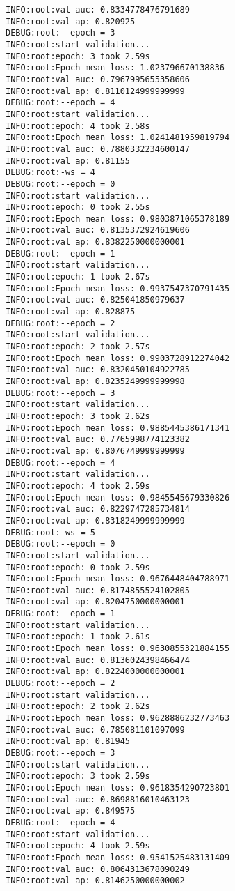 \documentclass[11pt]{article}
\begin{document}
\begin{verbatim}
INFO:root:val auc: 0.8334778476791689
INFO:root:val ap: 0.820925
DEBUG:root:--epoch = 3
INFO:root:start validation...
INFO:root:epoch: 3 took 2.59s
INFO:root:Epoch mean loss: 1.023796670138836
INFO:root:val auc: 0.7967995655358606
INFO:root:val ap: 0.8110124999999999
DEBUG:root:--epoch = 4
INFO:root:start validation...
INFO:root:epoch: 4 took 2.58s
INFO:root:Epoch mean loss: 1.0241481959819794
INFO:root:val auc: 0.7880332234600147
INFO:root:val ap: 0.81155
DEBUG:root:-ws = 4
DEBUG:root:--epoch = 0
INFO:root:start validation...
INFO:root:epoch: 0 took 2.55s
INFO:root:Epoch mean loss: 0.9803871065378189
INFO:root:val auc: 0.8135372924619606
INFO:root:val ap: 0.8382250000000001
DEBUG:root:--epoch = 1
INFO:root:start validation...
INFO:root:epoch: 1 took 2.67s
INFO:root:Epoch mean loss: 0.9937547370791435
INFO:root:val auc: 0.825041850979637
INFO:root:val ap: 0.828875
DEBUG:root:--epoch = 2
INFO:root:start validation...
INFO:root:epoch: 2 took 2.57s
INFO:root:Epoch mean loss: 0.9903728912274042
INFO:root:val auc: 0.8320450104922785
INFO:root:val ap: 0.8235249999999998
DEBUG:root:--epoch = 3
INFO:root:start validation...
INFO:root:epoch: 3 took 2.62s
INFO:root:Epoch mean loss: 0.9885445386171341
INFO:root:val auc: 0.7765998774123382
INFO:root:val ap: 0.8076749999999999
DEBUG:root:--epoch = 4
INFO:root:start validation...
INFO:root:epoch: 4 took 2.59s
INFO:root:Epoch mean loss: 0.9845545679330826
INFO:root:val auc: 0.8229747285734814
INFO:root:val ap: 0.8318249999999999
DEBUG:root:-ws = 5
DEBUG:root:--epoch = 0
INFO:root:start validation...
INFO:root:epoch: 0 took 2.59s
INFO:root:Epoch mean loss: 0.9676448404788971
INFO:root:val auc: 0.8174855524102805
INFO:root:val ap: 0.8204750000000001
DEBUG:root:--epoch = 1
INFO:root:start validation...
INFO:root:epoch: 1 took 2.61s
INFO:root:Epoch mean loss: 0.9630855321884155
INFO:root:val auc: 0.8136024398466474
INFO:root:val ap: 0.8224000000000001
DEBUG:root:--epoch = 2
INFO:root:start validation...
INFO:root:epoch: 2 took 2.62s
INFO:root:Epoch mean loss: 0.9628886232773463
INFO:root:val auc: 0.785081101097099
INFO:root:val ap: 0.81945
DEBUG:root:--epoch = 3
INFO:root:start validation...
INFO:root:epoch: 3 took 2.59s
INFO:root:Epoch mean loss: 0.9618354290723801
INFO:root:val auc: 0.8698816010463123
INFO:root:val ap: 0.849575
DEBUG:root:--epoch = 4
INFO:root:start validation...
INFO:root:epoch: 4 took 2.59s
INFO:root:Epoch mean loss: 0.9541525483131409
INFO:root:val auc: 0.8064313678090249
INFO:root:val ap: 0.8146250000000002
\end{verbatim}
\end{document}
